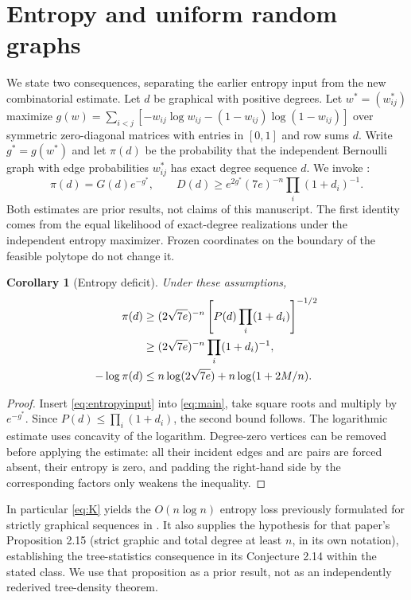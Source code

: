 \documentclass[11pt]{article}
\newtheorem{corollary}[theorem]{Corollary}
\theoremstyle{remark}\newtheorem{remark}[theorem]{Remark}
\begin{document}
\section{Entropy and uniform random graphs}\label{sec:entropy}
We state two consequences, separating the earlier entropy input from the new combinatorial estimate. Let $d$ be graphical with positive degrees. Let $w^*=(w_{ij}^*)$ maximize $g(w)=\sum_{i<j}[-w_{ij}\log w_{ij}-(1-w_{ij})\log(1-w_{ij})]$ over symmetric zero-diagonal matrices with entries in $[0,1]$ and row sums $d$. Write $g^*=g(w^*)$ and let $\pi(d)$ be the probability that the independent Bernoulli graph with edge probabilities $w_{ij}^*$ has exact degree sequence $d$. We invoke \cite[Theorems 4.2 and 6.1]{mehrdad26}:
\begin{equation}\label{eq:entropyinput}
 \pi(d)=G(d)e^{-g^*},\qquad
 D(d)\ge e^{2g^*}(7e)^{-n}\prod_i(1+d_i)^{-1}.
\end{equation}
Both estimates are prior results, not claims of this manuscript. The first identity comes from the equal likelihood of exact-degree realizations under the independent entropy maximizer. Frozen coordinates on the boundary of the feasible polytope do not change it.
\begin{corollary}[Entropy deficit]\label{cor:entropy}
Under these assumptions,
\begin{align}
 \pi(d)&\ge (2\sqrt{7e})^{-n}\left[P(d)\prod_i(1+d_i)\right]^{-1/2}\notag\\
 &\ge (2\sqrt{7e})^{-n}\prod_i(1+d_i)^{-1},\label{eq:pi}\\
 -\log\pi(d)&\le n\log(2\sqrt{7e})+n\log(1+2M/n).\label{eq:K}
\end{align}
\end{corollary}
\begin{proof}
Insert \eqref{eq:entropyinput} into \eqref{eq:main}, take square roots and multiply by $e^{-g^*}$. Since $P(d)\le\prod_i(1+d_i)$, the second bound follows. The logarithmic estimate uses concavity of the logarithm. Degree-zero vertices can be removed before applying the estimate: all their incident edges and arc pairs are forced absent, their entropy is zero, and padding the right-hand side by the corresponding factors only weakens the inequality.
\end{proof}
In particular \eqref{eq:K} yields the $O(n\log n)$ entropy loss previously formulated for strictly graphical sequences in \cite[Conjecture 2.13, version 4]{mehrdad14}. It also supplies the hypothesis for that paper's Proposition 2.15 (strict graphic and total degree at least $n$, in its own notation), establishing the tree-statistics consequence in its Conjecture 2.14 within the stated class. We use that proposition as a prior result, not as an independently rederived tree-density theorem.
\end{document}
